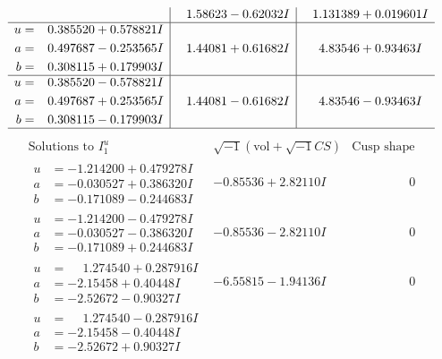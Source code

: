\documentclass[1p]{elsarticle_modified}
\theoremstyle{definition}
\newcommand{\I}{\sqrt{-1}}
\begin{document}
$$\begin{array}{c|c|c}
 & \phantom{-}1.58623 - 0.62032 I & \phantom{-}1.131389 + 0.019601 I \\ \hline\begin{aligned}
u &= \phantom{-}0.385520 + 0.578821 I \\
a &= \phantom{-}0.497687 - 0.253565 I \\
b &= \phantom{-}0.308115 + 0.179903 I\end{aligned}
 & \phantom{-}1.44081 + 0.61682 I & \phantom{-}4.83546 + 0.93463 I \\ \hline\begin{aligned}
u &= \phantom{-}0.385520 - 0.578821 I \\
a &= \phantom{-}0.497687 + 0.253565 I \\
b &= \phantom{-}0.308115 - 0.179903 I\end{aligned}
 & \phantom{-}1.44081 - 0.61682 I & \phantom{-}4.83546 - 0.93463 I\\
 \hline 
 \end{array}$$\newpage$$\begin{array}{c|c|c}  
\text{Solutions to }I^u_{1}& \I (\text{vol} + \sqrt{-1}CS) & \text{Cusp shape}\\
 \hline 
\begin{aligned}
u &= -1.214200 + 0.479278 I \\
a &= -0.030527 + 0.386320 I \\
b &= -0.171089 - 0.244683 I\end{aligned}
 & -0.85536 + 2.82110 I & \phantom{-0.000000 } 0 \\ \hline\begin{aligned}
u &= -1.214200 - 0.479278 I \\
a &= -0.030527 - 0.386320 I \\
b &= -0.171089 + 0.244683 I\end{aligned}
 & -0.85536 - 2.82110 I & \phantom{-0.000000 } 0 \\ \hline\begin{aligned}
u &= \phantom{-}1.274540 + 0.287916 I \\
a &= -2.15458 + 0.40448 I \\
b &= -2.52672 - 0.90327 I\end{aligned}
 & -6.55815 - 1.94136 I & \phantom{-0.000000 } 0 \\ \hline\begin{aligned}
u &= \phantom{-}1.274540 - 0.287916 I \\
a &= -2.15458 - 0.40448 I \\
b &= -2.52672 + 0.90327 I\end{aligned}

\end{array}$$
\end{document}
